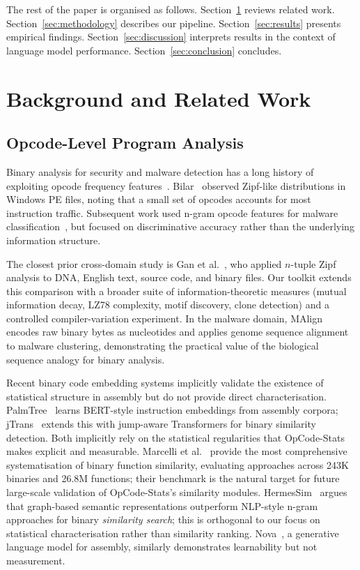 \documentclass[10pt,twocolumn]{article}
\begin{document}
The rest of the paper is organised as follows.
Section~\ref{sec:background} reviews related work.
Section~\ref{sec:methodology} describes our pipeline.
Section~\ref{sec:results} presents empirical findings.
Section~\ref{sec:discussion} interprets results in the context of language
model performance.
Section~\ref{sec:conclusion} concludes.

\section{Background and Related Work}
\label{sec:background}

\subsection{Opcode-Level Program Analysis}

Binary analysis for security and malware detection has a long history of
exploiting opcode frequency features~\cite{bilar2007opcodes,
masud2008machine}.  Bilar~\cite{bilar2007opcodes} observed Zipf-like
distributions in Windows PE files, noting that a small set of opcodes accounts
for most instruction traffic.  Subsequent work used n-gram opcode features for
malware classification~\cite{masud2008machine,santos2013opcode}, but focused
on discriminative accuracy rather than the underlying information structure.

The closest prior cross-domain study is Gan et al.~\cite{gan2009statistical},
who applied $n$-tuple Zipf analysis to DNA, English text, source code, and
binary files.  Our toolkit extends this comparison with a broader suite of
information-theoretic measures (mutual information decay, LZ78 complexity,
motif discovery, clone detection) and a controlled compiler-variation
experiment.  In the malware domain, MAlign~\cite{saha2024malign} encodes
raw binary bytes as nucleotides and applies genome sequence alignment to
malware clustering, demonstrating the practical value of the biological
sequence analogy for binary analysis.

Recent binary code embedding systems implicitly validate the existence of
statistical structure in assembly but do not provide direct characterisation.
PalmTree~\cite{li2021palmtree} learns BERT-style instruction embeddings from
assembly corpora; jTrans~\cite{wang2022jtrans} extends this with jump-aware
Transformers for binary similarity detection.  Both implicitly rely on the
statistical regularities that OpCode-Stats makes explicit and measurable.
Marcelli et al.~\cite{marcelli2022machine} provide the most comprehensive
systematisation of binary function similarity, evaluating approaches across
243K binaries and 26.8M functions; their benchmark is the natural target for
future large-scale validation of OpCode-Stats's similarity modules.
HermesSim~\cite{hermessim2024} argues that graph-based semantic
representations outperform NLP-style n-gram approaches for binary
\emph{similarity search}; this is orthogonal to our focus on
statistical characterisation rather than similarity ranking.
Nova~\cite{nova2025}, a generative language model for assembly, similarly
demonstrates learnability but not measurement.
\end{document}

